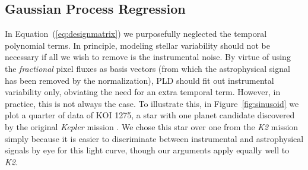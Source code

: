 \documentclass[]{emulateapj}
\begin{document}
\subsection{Gaussian Process Regression}
\label{sec:gp}
\begin{figure*}[t]
  \begin{center}
    \leavevmode
       \caption{Different de-trending techniques for quarter 4 of KIC 8583696 (KOI 1275),
                a planet candidate host from the original \emph{Kepler} mission. The original
                data are shown in the left column; in the other columns we
                artificially injected a sinusoidal signal with a period
                of 25 days and an amplitude comparable to that of the instrumental variability.
                The top row shows the raw SAP data (black) and the first order
                PLD model (red); the residuals of the fit are indicated directly below. 
                The third row shows the final residuals after smoothing 
                with a GP to eliminate low-frequency stellar variability. Finally, the bottom
                row shows these residuals folded on the orbital period of the planet
                candidate (black), with the 1-hr median indicated in red. Combining PLD with a GP
                ensures PLD fits out only the instrumental variability without inflating the white noise.
                }
     \label{fig:sinusoid}
  \end{center}
\end{figure*}

In Equation~(\ref{eq:designmatrix}) we purposefully neglected the temporal polynomial
terms. In principle, modeling stellar variability should not be necessary if all we wish 
to remove is the instrumental noise. By virtue of using the
\emph{fractional} pixel fluxes as basis vectors (from which the astrophysical signal
has been removed by the normalization), PLD should fit out instrumental variability only,
obviating the need for an extra temporal term. However, in practice, this is not always
the case. To illustrate this, in Figure~\ref{fig:sinusoid} we plot a quarter of data
of KOI 1275, a star with one planet candidate discovered by the original \emph{Kepler}
mission \citep{BOR11}. We chose this star over one from the \emph{K2}
mission simply because it is easier to discriminate between instrumental and
astrophysical signals by eye for this light curve, though our arguments apply
equally well to \emph{K2}.
\end{document}
